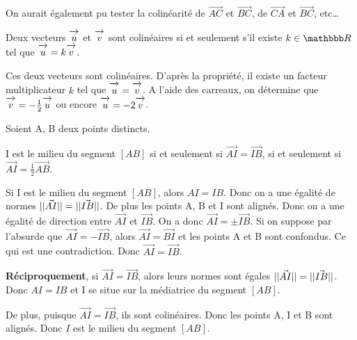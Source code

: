 \documentclass[10pt,a4paper,openany,twoside,prof]{book}
\begin{document}
\begin{rem}{}{}
	On aurait également pu tester la colinéarité de $\vec{AC}$ et $\vec{BC}$, de $\vec{CA}$ et $\vec{BC}$, etc\dots
\end{rem}

\begin{prop}{}{}
  Deux vecteurs $\overrightarrow{\,\mathstrut u\,}$ et $\overrightarrow{\,\mathstrut v\,}$ sont colinéaires si et seulement s'il existe $k\in\R$ tel que $\overrightarrow{\,\mathstrut u\,} = k\overrightarrow{\,\mathstrut v\,}$.
\end{prop}

\begin{ex}{}{}
	\begin{center}
	\end{center}
	Ces deux vecteurs sont colinéaires. D'après la propriété, il existe un facteur multiplicateur $k$ tel que $\overrightarrow{\,\mathstrut u\,}=\overrightarrow{\,\mathstrut v\,}$. A l'aide des carreaux, on détermine que $\overrightarrow{\,\mathstrut v\,} = -\frac{1}{2}\overrightarrow{\,\mathstrut u\,}$ ou encore $\overrightarrow{\,\mathstrut u\,} = -2\overrightarrow{\,\mathstrut v\,}$.
\end{ex}

\begin{cor}{}{}
	Soient A, B deux points distincts.

	I est le milieu du segment $[AB]$ si et seulement si $\vec{AI} = \vec{IB}$, si et seulement si $\vec{AI} = \frac{1}{2}\vec{AB}$.
\end{cor}

\begin{dem}{}{}
	Si I est le milieu du segment $[AB]$, alors $AI=IB$. Donc on a une égalité de normes $||\vec{AI} ||= ||\vec{IB}||$. De plus les points A, B et I sont alignés. Donc on a une égalité de direction entre $\vec{AI}$ et $\vec{IB}$. On a donc $\vec{AI}=\pm\vec{IB}$. Si on suppose par l'absurde que $\vec{AI}=-\vec{IB}$, alors $\vec{AI}=\vec{BI}$ et les points A et B sont confondus. Ce qui est une contradiction. Donc $\vec{AI}=\vec{IB}$.

	\smallskip
	\textbf{Réciproquement}, si $\vec{AI} = \vec{IB}$, alors leurs normes sont égales $||\vec{AI} ||= ||\vec{IB}||$. Donc $AI=IB$ et I se situe sur la médiatrice du segment $[AB]$.

	De plus, puisque $\vec{AI} = \vec{IB}$, ils sont colinéaires. Donc les points A, I et B sont alignés. Donc $I$ est le milieu du segment $[AB]$.
\end{dem}
\end{document}
